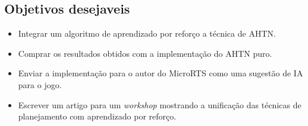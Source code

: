 \subsection{Objetivos desejaveis}
\begin{itemize}
	\item Integrar um algoritmo de aprendizado por reforço a técnica de AHTN.
	\item Comprar os resultados obtidos com a implementação do AHTN puro.
	\item Enviar a implementação para o autor do MicroRTS como uma sugestão de IA para o jogo.
	\item Escrever um artigo para um \textit{workshop} mostrando a unificação das técnicas de planejamento com aprendizado por reforço.
\end{itemize}

